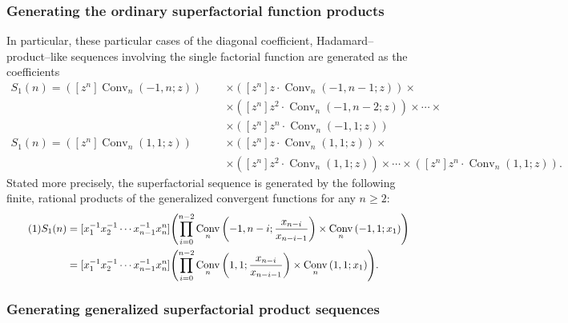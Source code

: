 \documentclass[12pt,reqno]{article}
\numberwithin{sfootnote}{section}
\numberwithin{equation}{section}
\newcommand{\tagonce}[0]{
     \addtocounter{equation}{1}
     \tag{\theequation}
}
\theoremstyle{plain}
\theoremstyle{definition}
\theoremstyle{remark}
\newcommand{\ConvGF}[4]{\ensuremath{\Conv_{#1}\left(#2, #3; #4\right)}}
\DeclareMathOperator{\Conv}{Conv}
\begin{document}
\subsubsection{Generating the ordinary superfactorial function products} 

In particular, 
these particular cases of the 
diagonal coefficient, Hadamard--product--like sequences involving the 
single factorial function are generated as the coefficients 
\begin{align*} 
S_1(n) = 
     \left([z^{n}] \ConvGF{n}{-1}{n}{z}\right) & \times 
     \left([z^{n}] z \cdot \ConvGF{n}{-1}{n-1}{z}\right) 
     \times \\ 
     & \times 
     \left([z^{n}] z^2 \cdot \ConvGF{n}{-1}{n-2}{z}\right) 
     \times \cdots \times \\ 
     & \times 
     \left([z^{n}] z^{n} \cdot \ConvGF{n}{-1}{1}{z}\right) \\ 
S_1(n) = 
     \left([z^{n}] \ConvGF{n}{1}{1}{z}\right) 
     \phantom{_{+1}-} & \times 
     \left([z^{n}] z \cdot \ConvGF{n}{1}{1}{z}\right) 
     \times \\ 
     & \times 
     \left([z^{n}] z^2 \cdot \ConvGF{n}{1}{1}{z}\right) 
     \times \cdots \times 
     \left([z^{n}] z^{n} \cdot \ConvGF{n}{1}{1}{z}\right). 
\end{align*} 
Stated more precisely, the 
superfactorial sequence is generated by the following 
finite, rational products of the generalized convergent functions 
for any $n \geq 2$: 
\begin{align*} 
\tagonce\label{eqn_SuperFactFn_S1n_RationalHP-DiagGF_ProductIdents-stmts_v1} 
S_1(n) 
     & = 
     [x_1^{-1} x_2^{-1} \cdots x_{n-1}^{-1} x_n^{n}] 
     \Biggl( 
     \prod_{i=0}^{n-2} 
     \ConvGF{n}{-1}{n-i}{\frac{x_{n-i}}{x_{n-i-1}}} \times 
     \ConvGF{n}{-1}{1}{x_1} 
     \Biggr) \\ 
     & = 
     [x_1^{-1} x_2^{-1} \cdots x_{n-1}^{-1} x_n^{n}] 
     \Biggl( 
     \prod_{i=0}^{n-2} 
     \ConvGF{n}{1}{1}{\frac{x_{n-i}}{x_{n-i-1}}} \times 
     \ConvGF{n}{1}{1}{x_1} 
     \Biggr). 
\end{align*} 

\subsubsection{Generating generalized superfactorial product sequences} 
\end{document}
